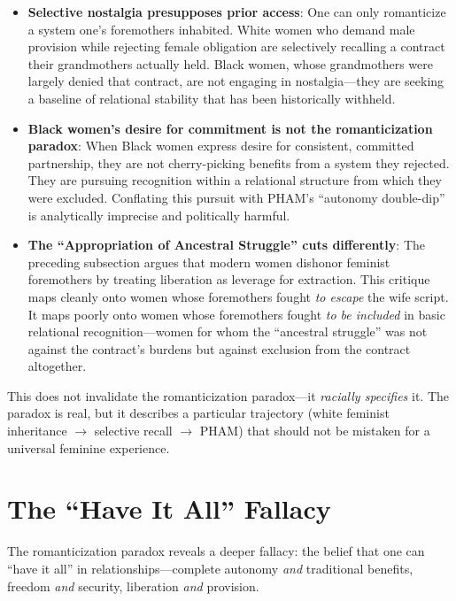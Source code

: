 \documentclass[12pt,openany]{book}
\numberwithin{equation}{chapter}
\begin{document}
\begin{itemize}
    \item \textbf{Selective nostalgia presupposes prior access}: One can only romanticize a system one's foremothers inhabited. White women who demand male provision while rejecting female obligation are selectively recalling a contract their grandmothers actually held. Black women, whose grandmothers were largely denied that contract, are not engaging in nostalgia---they are seeking a baseline of relational stability that has been historically withheld.
    
    \item \textbf{Black women's desire for commitment is not the romanticization paradox}: When Black women express desire for consistent, committed partnership, they are not cherry-picking benefits from a system they rejected. They are pursuing recognition within a relational structure from which they were excluded. Conflating this pursuit with PHAM's ``autonomy double-dip'' is analytically imprecise and politically harmful.
    
    \item \textbf{The ``Appropriation of Ancestral Struggle'' cuts differently}: The preceding subsection argues that modern women dishonor feminist foremothers by treating liberation as leverage for extraction. This critique maps cleanly onto women whose foremothers fought \textit{to escape} the wife script. It maps poorly onto women whose foremothers fought \textit{to be included} in basic relational recognition---women for whom the ``ancestral struggle'' was not against the contract's burdens but against exclusion from the contract altogether.
\end{itemize}

This does not invalidate the romanticization paradox---it \textit{racially specifies} it. The paradox is real, but it describes a particular trajectory (white feminist inheritance $\to$ selective recall $\to$ PHAM) that should not be mistaken for a universal feminine experience.

\section{The ``Have It All'' Fallacy}

The romanticization paradox reveals a deeper fallacy: the belief that one can ``have it all'' in relationships---complete autonomy \textit{and} traditional benefits, freedom \textit{and} security, liberation \textit{and} provision.
\end{document}
